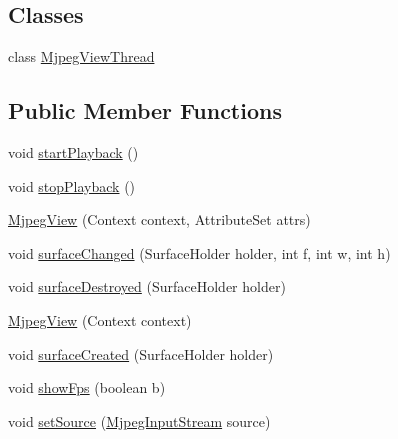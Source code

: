 \subsection*{Classes}
\begin{DoxyCompactItemize}
\item 
class \hyperlink{classandroid_1_1app_1_1printerapp_1_1devices_1_1camera_1_1_mjpeg_view_1_1_mjpeg_view_thread}{Mjpeg\+View\+Thread}
\end{DoxyCompactItemize}
\subsection*{Public Member Functions}
\begin{DoxyCompactItemize}
\item 
void \hyperlink{classandroid_1_1app_1_1printerapp_1_1devices_1_1camera_1_1_mjpeg_view_a5c6983bb21d6764d334dea6e02c103e0}{start\+Playback} ()
\item 
void \hyperlink{classandroid_1_1app_1_1printerapp_1_1devices_1_1camera_1_1_mjpeg_view_aa3200c03bae4348616f0575f84f9e07d}{stop\+Playback} ()
\item 
\hyperlink{classandroid_1_1app_1_1printerapp_1_1devices_1_1camera_1_1_mjpeg_view_a2fbd2b846961a756d86c14643c3ce43b}{Mjpeg\+View} (Context context, Attribute\+Set attrs)
\item 
void \hyperlink{classandroid_1_1app_1_1printerapp_1_1devices_1_1camera_1_1_mjpeg_view_a6e19c8bb8fa29fe15a9b997da050333a}{surface\+Changed} (Surface\+Holder holder, int f, int w, int h)
\item 
void \hyperlink{classandroid_1_1app_1_1printerapp_1_1devices_1_1camera_1_1_mjpeg_view_a2bd421e0d33457612139aebaae58f920}{surface\+Destroyed} (Surface\+Holder holder)
\item 
\hyperlink{classandroid_1_1app_1_1printerapp_1_1devices_1_1camera_1_1_mjpeg_view_ac7539c69f75a74d751084854b18b1bc3}{Mjpeg\+View} (Context context)
\item 
void \hyperlink{classandroid_1_1app_1_1printerapp_1_1devices_1_1camera_1_1_mjpeg_view_a828ebfb80f31b87508776b23aaa3b84c}{surface\+Created} (Surface\+Holder holder)
\item 
void \hyperlink{classandroid_1_1app_1_1printerapp_1_1devices_1_1camera_1_1_mjpeg_view_a7eedaa81fec0e391ee80f1885ce9c977}{show\+Fps} (boolean b)
\item 
void \hyperlink{classandroid_1_1app_1_1printerapp_1_1devices_1_1camera_1_1_mjpeg_view_a5871384eaf7cdc732347f6a49eb7ccce}{set\+Source} (\hyperlink{classandroid_1_1app_1_1printerapp_1_1devices_1_1camera_1_1_mjpeg_input_stream}{Mjpeg\+Input\+Stream} source)

\end{DoxyCompactItemize}
